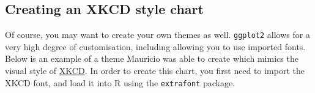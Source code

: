 \subsection{Creating an XKCD style
chart}\label{creating-an-xkcd-style-chart}

Of course, you may want to create your own themes as well.
\texttt{ggplot2} allows for a very high degree of customisation,
including allowing you to use imported fonts. Below is an example of a
theme Mauricio was able to create which mimics the visual style of
\href{http://xkcd.com/}{XKCD}. In order to create this chart, you first
need to import the XKCD font, and load it into R using the
\texttt{extrafont} package.

\begin{Shaded}
\begin{Highlighting}[]
\StringTok{ }\NormalTok{(}
\StringTok{  }\NormalTok{(}\NormalTok{) +}\StringTok{ }\NormalTok{(}\NormalTok{) +}
\StringTok{  }\NormalTok{(}\NormalTok{) +}
\StringTok{  }\NormalTok{(} \NormalTok{) +}
\StringTok{  }\NormalTok{(} \NormalTok{) +}
\StringTok{  }\NormalTok{(}\NormalTok{, } \NormalTok{, } \NormalTok{, } \NormalTok{-}\NormalTok{, } \NormalTok{-}\NormalTok{, }
    \NormalTok{, }\NormalTok{) +}\StringTok{ }
\StringTok{  }\NormalTok{(}\NormalTok{, } \NormalTok{, } \NormalTok{-}\NormalTok{, }  \NormalTok{) +}\StringTok{ }
\StringTok{  }\NormalTok{(} \NormalTok{(}\NormalTok{, } \NormalTok{), }

\end{Highlighting}
\end{Shaded}
